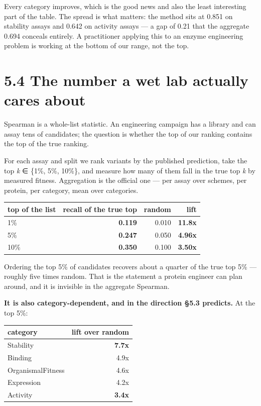 \documentclass[sigconf,review,nonacm]{acmart}
\begin{document}
Every category improves, which is the good news and also the least interesting part of the table. The
spread is what matters: the method sits at 0.851 on stability assays and 0.642 on activity assays --- a
gap of 0.21 that the aggregate 0.694 conceals entirely. A practitioner applying this to an enzyme
engineering problem is working at the bottom of our range, not the top.

\hypertarget{the-number-a-wet-lab-actually-cares-about}{%
\section{5.4 The number a wet lab actually cares about}\label{the-number-a-wet-lab-actually-cares-about}}

Spearman is a whole-list statistic. An engineering campaign has a library and can assay tens of
candidates; the question is whether the top of our ranking contains the top of the true ranking.

For each assay and split we rank variants by the published prediction, take the top \emph{k} ∈ \{1\%, 5\%, 10\%\},
and measure how many of them fall in the true top \emph{k} by measured fitness. Aggregation is the official
one --- per assay over schemes, per protein, per category, mean over categories.

\begin{table}[t]
\centering
\small
\begin{tabular}{lrrr}
\hline
top of the list & recall of the true top & random & lift \\
\hline
1\% & \textbf{0.119} & 0.010 & \textbf{11.8x} \\
5\% & \textbf{0.247} & 0.050 & \textbf{4.96x} \\
10\% & \textbf{0.350} & 0.100 & \textbf{3.50x} \\
\hline
\end{tabular}
\end{table}

Ordering the top 5\% of candidates recovers about a quarter of the true top 5\% --- roughly five times
random. That is the statement a protein engineer can plan around, and it is invisible in the aggregate
Spearman.

\textbf{It is also category-dependent, and in the direction §5.3 predicts.} At the top 5\%:

\begin{table}[t]
\centering
\small
\begin{tabular}{lr}
\hline
category & lift over random \\
\hline
Stability & \textbf{7.7x} \\
Binding & 4.9x \\
OrganismalFitness & 4.6x \\
Expression & 4.2x \\
Activity & \textbf{3.4x} \\
\hline
\end{tabular}
\end{table}
\end{document}
